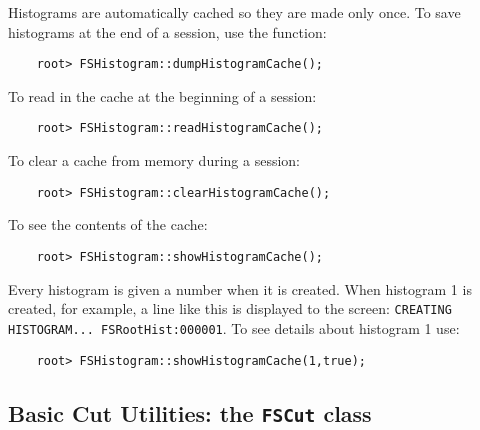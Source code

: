 \documentclass[11pt]{article}
\begin{document}
Histograms are automatically cached so they are made only once.  To save histograms at the end of a session, use the function:
\begin{verbatim}
    root> FSHistogram::dumpHistogramCache(); 
\end{verbatim}
To read in the cache at the beginning of a session:
\begin{verbatim}
    root> FSHistogram::readHistogramCache(); 
\end{verbatim}
To clear a cache from memory during a session:
\begin{verbatim}
    root> FSHistogram::clearHistogramCache(); 
\end{verbatim}
To see the contents of the cache:
\begin{verbatim}
    root> FSHistogram::showHistogramCache(); 
\end{verbatim}
Every histogram is given a number when it is created.  When histogram 1 is created, for example, a line like this is displayed to the screen:
{\tt CREATING HISTOGRAM... FSRootHist:000001}.  To see details about histogram 1 use:
\begin{verbatim}
    root> FSHistogram::showHistogramCache(1,true); 
\end{verbatim}

\subsection{Basic Cut Utilities: the {\tt FSCut} class}
\label{sec:cut}
\end{document}
